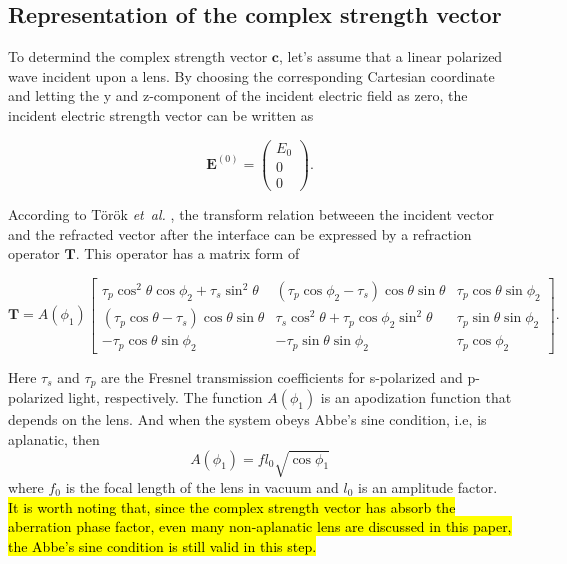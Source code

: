 \documentclass[9pt,twocolumn,twoside]{osajnl}
\begin{document}
\subsection{Representation of the complex strength vector}
To determind the complex strength vector $\mathbf{c}$, let's assume that a linear polarized wave incident upon a lens. By choosing the corresponding Cartesian coordinate and letting the y and z-component of the incident electric field as zero, the incident electric strength vector can be written as

\begin{equation}\label{eq:18}
	\mathbf{E}^{(0)}=
	\begin{pmatrix}
		E_0\\
		0\\
		0
	\end{pmatrix}.
\end{equation}

According to T\"or\"ok \emph{et~al.} \cite{torok1995electromagnetic}, the transform relation betweeen the incident vector and the refracted vector after the interface can be expressed by a refraction operator $\mathbf{T}$. This operator has a matrix form of 

\begin{strip}
	\begin{equation}\label{eq:19}
		\mathbf{T}=A(\phi_1)
		\begin{bmatrix}
			\tau_p\cos^2\theta\cos\phi_2+\tau_s\sin^2\theta& (\tau_p\cos\phi_2-\tau_s)\cos\theta\sin\theta& \tau_p\cos\theta\sin\phi_2\\
			(\tau_p\cos\theta-\tau_s)\cos\theta\sin\theta& \tau_s\cos^2\theta+\tau_p\cos\phi_2\sin^2\theta& \tau_p\sin\theta\sin\phi_2\\
			-\tau_p\cos\theta\sin\phi_2& -\tau_p\sin\theta\sin\phi_2& \tau_p\cos\phi_2
		\end{bmatrix}.
	\end{equation}	
\end{strip} 

Here $\tau_s$ and $\tau_p$ are the Fresnel transmission coefficients for s-polarized and p-polarized light, respectively. The function $A(\phi_1)$ is an apodization function that depends on the lens. And when the system obeys Abbe's sine condition, i.e, is aplanatic, then
\begin{equation}\label{eq:20}
	A(\phi_1)=f l_0\sqrt{\cos\phi_1}
\end{equation}
where $f_0$ is the focal length of the lens in vacuum and $l_0$ is an amplitude factor. \hl{It is worth noting that, since the complex strength vector has absorb the aberration phase factor, even many non-aplanatic lens are discussed in this paper, the Abbe's sine condition is still valid in this step.} 
\end{document}
